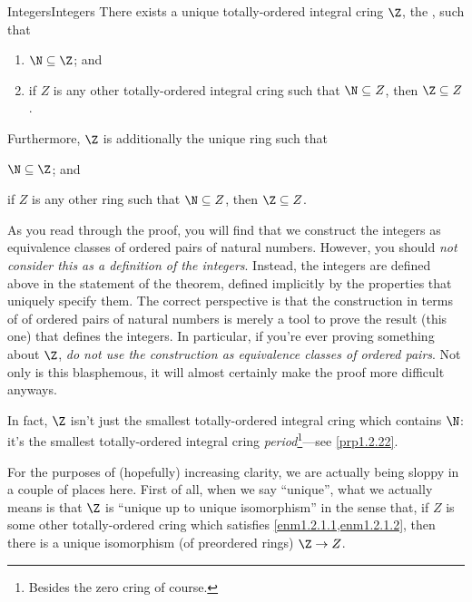 \begin{thm}{Integers}{Integers}
There exists a unique totally-ordered integral cring $\Z$\index[notation]{$\Z$}, the , such that
\begin{enumerate}
\item \label{enm1.2.1.1}$\N \subseteq \Z$; and
\item \label{enm1.2.1.2}if $Z$ is any other totally-ordered integral cring such that $\N \subseteq Z$, then $\Z \subseteq Z$.
\end{enumerate}

Furthermore, $\Z$ is additionally the unique ring such that
\begin{enumerateprime}
\item \label{Integers.i}$\N \subseteq \Z$; and
\item \label{Integers.ii}if $Z$ is any other ring such that $\N \subseteq Z$, then $\Z \subseteq Z$.
\end{enumerateprime}
\begin{rmk}
As you read through the proof, you will find that we construct the integers as equivalence classes of ordered pairs of natural numbers.  However, you should \emph{not consider this as a definition of the integers}.  Instead, the integers are defined above in the statement of the theorem, defined implicitly by the properties that uniquely specify them.  The correct perspective is that the construction in terms of of ordered pairs of natural numbers is merely a tool to prove the result (this one) that defines the integers.  In particular, if you're ever proving something about $\Z$, \emph{do not use the construction as equivalence classes of ordered pairs}.  Not only is this blasphemous, it will almost certainly make the proof more difficult anyways.
\end{rmk}
\begin{rmk}
In fact, $\Z$ isn't just the smallest totally-ordered integral cring which contains $\N$:  it's the smallest totally-ordered integral cring \emph{period}\footnote{Besides the zero cring of course.}---see \cref{prp1.2.22}.
\end{rmk}
\begin{rmk}
For the purposes of (hopefully) increasing clarity, we are actually being sloppy in a couple of places here.  First of all, when we say ``unique'', what we actually means is that $\Z$ is ``unique up to unique isomorphism'' in the sense that, if $Z$ is some other totally-ordered cring which satisfies \cref{enm1.2.1.1,enm1.2.1.2}, then there is a unique isomorphism (of preordered rings) $\Z \rightarrow Z$.


\end{rmk}
\end{thm}
